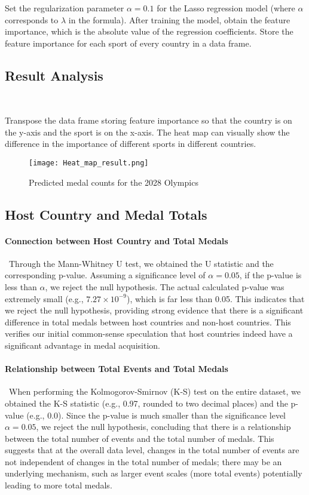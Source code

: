 \documentclass[12pt]{article}
\begin{document}
Set the regularization parameter $ \alpha = 0.1 $ for the Lasso regression model (where $ \alpha $ corresponds to $ \lambda $ in the formula). After training the model, obtain the feature importance, which is the absolute value of the regression coefficients. Store the feature importance for each sport of every country in a data frame.

\subsection{Result Analysis} \

Transpose the data frame storing feature importance so that the country is on the y-axis and the sport is on the x-axis. The heat map can visually show the difference in the importance of different sports in different countries.

\begin{figure}[H]
    \centering
    \texttt{[image: Heat\_map\_result.png]}
    \caption{Predicted medal counts for the 2028 Olympics}
    \label{fig:3}
\end{figure}

\subsection{Host Country and Medal Totals}

\paragraph{Connection between Host Country and Total Medals} \
Through the Mann-Whitney U test, we obtained the U statistic and the corresponding p-value. Assuming a significance level of $\alpha=0.05$, if the p-value is less than $\alpha$, we reject the null hypothesis. The actual calculated p-value was extremely small (e.g., $7.27 \times 10^{-9}$), which is far less than 0.05. This indicates that we reject the null hypothesis, providing strong evidence that there is a significant difference in total medals between host countries and non-host countries. This verifies our initial common-sense speculation that host countries indeed have a significant advantage in medal acquisition.

\paragraph{Relationship between Total Events and Total Medals} \
When performing the Kolmogorov-Smirnov (K-S) test on the entire dataset, we obtained the K-S statistic (e.g., 0.97, rounded to two decimal places) and the p-value (e.g., 0.0). Since the p-value is much smaller than the significance level $\alpha=0.05$, we reject the null hypothesis, concluding that there is a relationship between the total number of events and the total number of medals. This suggests that at the overall data level, changes in the total number of events are not independent of changes in the total number of medals; there may be an underlying mechanism, such as larger event scales (more total events) potentially leading to more total medals.
\end{document}
